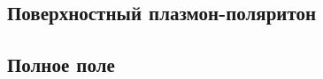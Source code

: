 \subsection{Поверхностный плазмон-поляритон}\label{subsec:spp}

\subsection{Полное поле}\label{subsec:full_field}













